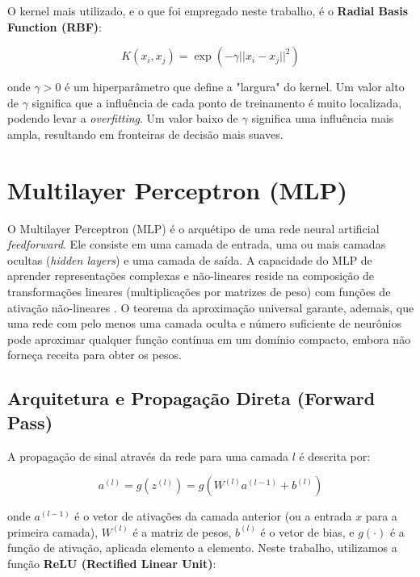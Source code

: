 \documentclass[12pt, a4paper, oneside]{report}
\begin{document}
O kernel mais utilizado, e o que foi empregado neste trabalho, é o \textbf{Radial Basis Function (RBF)}:

\begin{equation}
    K(x_i, x_j) = \exp(-\gamma ||x_i - x_j||^2)
\end{equation}

onde $\gamma > 0$ é um hiperparâmetro que define a "largura" do kernel. Um valor alto de $\gamma$ significa que a influência de cada ponto de treinamento é muito localizada, podendo levar a \textit{overfitting}. Um valor baixo de $\gamma$ significa uma influência mais ampla, resultando em fronteiras de decisão mais suaves.

\section{Multilayer Perceptron (MLP)}

O Multilayer Perceptron (MLP) é o arquétipo de uma rede neural artificial \textit{feedforward}. Ele consiste em uma camada de entrada, uma ou mais camadas ocultas (\textit{hidden layers}) e uma camada de saída. A capacidade do MLP de aprender representações complexas e não-lineares reside na composição de transformações lineares (multiplicações por matrizes de peso) com funções de ativação não-lineares \cite{rumelhart1986}. O teorema da aproximação universal \cite{cybenko1989} garante, ademais, que uma rede com pelo menos uma camada oculta e número suficiente de neurônios pode aproximar qualquer função contínua em um domínio compacto, embora não forneça receita para obter os pesos.

\subsection{Arquitetura e Propagação Direta (Forward Pass)}

A propagação de sinal através da rede para uma camada $l$ é descrita por:

\begin{equation}
    a^{(l)} = g(z^{(l)}) = g(W^{(l)} a^{(l-1)} + b^{(l)})
\end{equation}

onde $a^{(l-1)}$ é o vetor de ativações da camada anterior (ou a entrada $x$ para a primeira camada), $W^{(l)}$ é a matriz de pesos, $b^{(l)}$ é o vetor de bias, e $g(\cdot)$ é a função de ativação, aplicada elemento a elemento. Neste trabalho, utilizamos a função \textbf{ReLU (Rectified Linear Unit)}:
\end{document}

